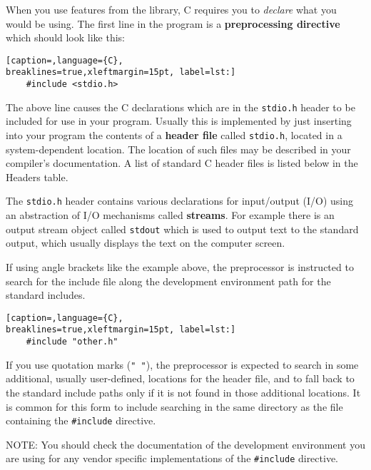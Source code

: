 When you use features from the library, C requires you to \emph{declare} what
you would be using. The first line in the program is a \textbf{preprocessing
directive} which should look like this:
\lstset{basicstyle=\scriptsize, numbers=left, captionpos=b, tabsize=4}
\begin{lstlisting}[caption=,language={C},
breaklines=true,xleftmargin=15pt, label=lst:]
	#include <stdio.h>
\end{lstlisting}

The above line causes the C declarations which are in the \texttt{stdio.h}
header to be included for use in your program. Usually this is implemented by
just inserting into your program the contents of a \textbf{header file} called
\texttt{stdio.h}, located in a system-dependent location. The location of such
files may be described in your compiler's documentation. A list of standard C
header files is listed below in the Headers table.

The \texttt{stdio.h} header contains various declarations for input/output
(I/O) using an abstraction of I/O mechanisms called \textbf{streams}. For
example there is an output stream object called \texttt{stdout} which is used
to output text to the standard output, which usually displays the text on the
computer screen.

If using angle brackets like the example above, the preprocessor is instructed
to search for the include file along the development environment path for the
standard includes.
\lstset{basicstyle=\scriptsize, numbers=left, captionpos=b, tabsize=4}
\begin{lstlisting}[caption=,language={C},
breaklines=true,xleftmargin=15pt, label=lst:]
	#include "other.h"
\end{lstlisting}

If you use quotation marks (\texttt{" "}), the preprocessor is expected to
search in some additional, usually user-defined, locations for the header file,
and to fall back to the standard include paths only if it is not found in those
additional locations. It is common for this form to include searching in the
same directory as the file containing the \texttt{\#include} directive.

NOTE: You should check the documentation of the development environment you
are using for any vendor specific implementations of the \texttt{\#include}
directive. \\

